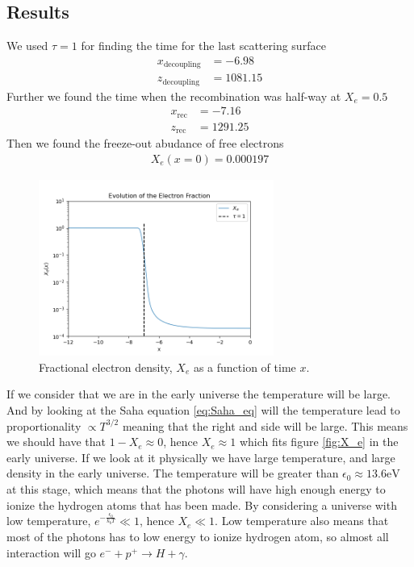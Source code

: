 \documentclass{aa}
\begin{document}
\subsection{Results}
We used $\tau=1$ for finding the time for the last scattering surface 
\begin{align*}
    x_\text{decoupling} &=-6.98\\
    z_\text{decoupling}&=1081.15
\end{align*}
Further we found the time when the recombination was half-way at $X_e=0.5$
\begin{align*}
    x_\text{rec} &=-7.16\\
    z_\text{rec}&=1291.25
\end{align*}
Then we found the freeze-out abudance of free electrons
\begin{align*}
    X_e(x=0)=0.000197
\end{align*}
\begin{figure}[H]
	\centering
	\includegraphics[width=77mm]{Electron_fraction.png}
	\caption{Fractional electron density, $X_e$ as a function of time $x$. }
	\label{fig:X_e}
\end{figure}
If we consider that we are in the early universe the temperature will be large. And by looking at the Saha equation \eqref{eq:Saha_eq} will the temperature lead to proportionality $\propto T^{3/2}$ meaning that the right and side will be large. This means we should have that $1-X_e\approx0$, hence $X_e\approx1$ which fits figure \eqref{fig:X_e} in the early universe. If we look at it physically we have large temperature, and large density in the early universe. The temperature will be greater than $\epsilon_0\approx13.6\text{eV}$ at this stage, which means that the photons will have high enough energy to ionize the hydrogen atoms that has been made. By considering a universe with low temperature, $e^{-\frac{\epsilon_0}{k_bT}}\ll1$, hence $X_e\ll1$. Low temperature also means that most of the photons has to low energy to ionize hydrogen atom, so almost all interaction will go $e^- + p^+ \to H +  \gamma$.\\
\end{document}
